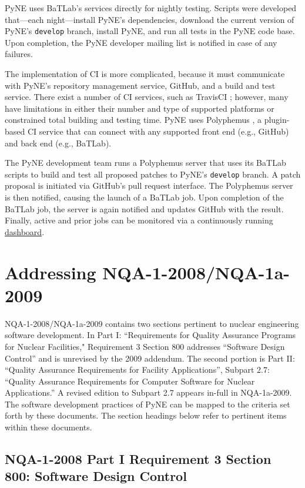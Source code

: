 \documentclass{anstrans}
\begin{document}
PyNE uses BaTLab's services directly for nightly testing. Scripts were
developed that---each night---install PyNE's dependencies, download the current version
of PyNE's \texttt{develop} branch, install PyNE, and run all tests in the PyNE
code base. Upon completion, the PyNE developer mailing list is notified in case of
any failures.

The implementation of CI is more complicated, because it
must communicate with PyNE's repository management service, GitHub, and a build
and test service. There exist a number of CI services, such as TravisCI
\cite{travis_2014}; however, many have limitations in either their number and
type of supported platforms or constrained total building and testing time. PyNE
uses Polyphemus \cite{polyphemus_2014}, a plugin-based CI service that can
connect with any supported front end (e.g., GitHub) and back end (e.g., BaTLab).

The PyNE development team runs a Polyphemus server that uses its BaTLab
scripts to build and test all proposed patches to PyNE's \texttt{develop}
branch. A patch proposal is initiated via GitHub's pull request
interface. The Polyphemus server is then notified, causing the launch of a
BaTLab job. Upon completion of the BaTLab job, the server is again notified and
updates GitHub with the result. Finally, active and prior jobs can be monitored
via a continuously running \href{http://gorgus.pyne.io/dashboard}{dashboard}.


\section{Addressing NQA-1-2008/NQA-1a-2009}

NQA-1-2008/NQA-1a-2009 contains two sections pertinent to nuclear engineering
software development. In Part I: ``Requirements for Quality Assurance Programs
for Nuclear Facilities," Requirement 3 Section 800 addresses ``Software Design
Control'' and is unrevised by the 2009 addendum. The second portion is Part II:
``Quality Assurance Requirements for Facility Applications'', Subpart 2.7:
``Quality Assurance Requirements for Computer Software for Nuclear
Applications.'' A revised edition to Subpart 2.7 appears in-full in NQA-1a-2009.
The software development practices of PyNE can be mapped to the criteria set
forth by these documents. The section headings below refer to pertinent items
within these documents.

\subsection{NQA-1-2008 Part I Requirement 3 Section 800: Software Design Control}
\end{document}
